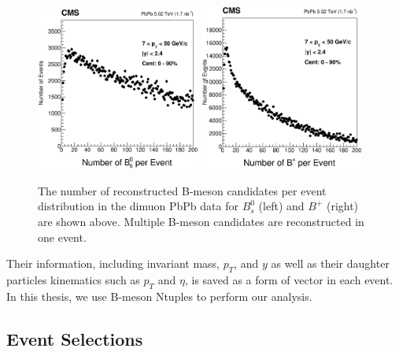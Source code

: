 \begin{figure}[h]
\begin{center}
\includegraphics[width= 0.48\textwidth]{Figures/Chapter5/BsSize.eps}
\includegraphics[width= 0.48\textwidth]{Figures/Chapter5/BPSize.eps}
\caption{The number of reconstructed B-meson candidates per event distribution in the dimuon PbPb data for $B^0_s$ (left) and $B^+$ (right) are shown above. Multiple B-meson candidates are reconstructed in one event.}
\label{BCand}
\end{center}
\end{figure}


Their information, including invariant mass, $p_T$, and $y$ as well as their daughter particles kinematics such as $p_T$ and $\eta$, is saved as a form of vector in each event. In this thesis, we use B-meson Ntuples to perform our analysis.




\subsection{Event Selections}

